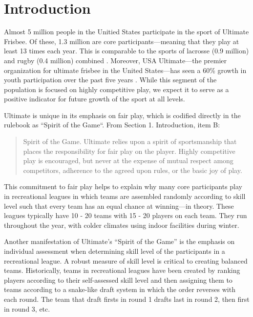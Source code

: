\section{Introduction}\label{sec:introduction}

Almost 5 million people in the Unitied States participate in the sport of Ultimate Frisbee.  Of these, 1.3 million are core participants---meaning that they play at least 13 times each year.  This is comparable to the sports of lacrosse (0.9 million) and rugby (0.4 million) combined \cite{sfia_2016}. Moreover, USA Ultimate---the premier organization for ultimate frisbee in the United States---has seen a 60\% growth in youth participation over the past five years \cite{usau_2016}.  While this segment of the population is focused on highly competitive play, we expect it to serve as a positive indicator for future growth of the sport at all levels.

Ultimate is unique in its emphasis on fair play, which is codified directly in the rulebook as ``Spirit of the Game``.  From Section 1. Introduction, item B:

\begin{quote} Spirit of the Game. Ultimate relies upon a spirit of sportsmanship that places the responsibility for fair play on the player. Highly competitive play is encouraged, but never at the expense of mutual respect among competitors, adherence to the agreed upon rules, or the basic joy of play.
\end{quote}

This commitment to fair play helps to explain why many core participants play in recreational leagues in which teams are assembled randomly according to skill level such that every team has an equal chance at winning---in theory.  These leagues typically have 10 - 20 teams with 15 - 20 players on each team.  They run throughout the year, with colder climates using indoor facilities during winter.

Another manifestation of Ultimate's ``Spirit of the Game'' is the emphasis on individual assessment when determining skill level of the participants in a recreational league.  A robust measure of skill level is critical to creating balanced teams.  Historically, teams in recreational leagues have been created by ranking players according to their self-assessed skill level and then assigning them to teams according to a snake-like draft system in which the order reverses with each round.  The team that draft firsts in round 1 drafts last in round 2, then first in round 3, etc.

